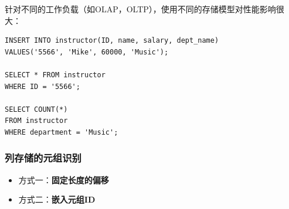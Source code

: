 \documentclass[aspectratio=169, 14pt]{beamer}
\begin{document}
\begin{frame}[fragile]

针对不同的工作负载（如OLAP，OLTP），使用不同的存储模型对性能影响很大：

\begin{verbatim}
INSERT INTO instructor(ID, name, salary, dept_name)
VALUES('5566', 'Mike', 60000, 'Music');

SELECT * FROM instructor
WHERE ID = '5566';

SELECT COUNT(*)
FROM instructor
WHERE department = 'Music';
\end{verbatim}

\end{frame}

\begin{frame}[fragile]
    \frametitle{列存储的元组识别}
    \begin{itemize}
        \item 方式一：\textbf{固定长度的偏移}
        \item 方式二：\textbf{嵌入元组ID}
    \end{itemize}

\end{frame}
\end{document}
